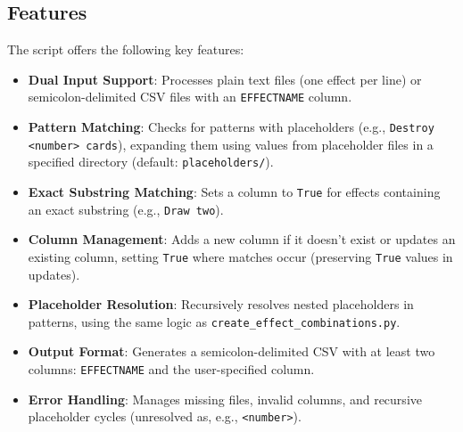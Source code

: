 \subsection{Features}
The script offers the following key features:
\begin{itemize}
    \item \textbf{Dual Input Support}: Processes plain text files (one effect per line) or semicolon-delimited CSV files with an \texttt{EFFECTNAME} column.
    \item \textbf{Pattern Matching}: Checks for patterns with placeholders (e.g., \texttt{Destroy <number> cards}), expanding them using values from placeholder files in a specified directory (default: \texttt{placeholders/}).
    \item \textbf{Exact Substring Matching}: Sets a column to \texttt{True} for effects containing an exact substring (e.g., \texttt{Draw two}).
    \item \textbf{Column Management}: Adds a new column if it doesn’t exist or updates an existing column, setting \texttt{True} where matches occur (preserving \texttt{True} values in updates).
    \item \textbf{Placeholder Resolution}: Recursively resolves nested placeholders in patterns, using the same logic as \texttt{create\_effect\_combinations.py}.
    \item \textbf{Output Format}: Generates a semicolon-delimited CSV with at least two columns: \texttt{EFFECTNAME} and the user-specified column.
    \item \textbf{Error Handling}: Manages missing files, invalid columns, and recursive placeholder cycles (unresolved as, e.g., \texttt{<number>}).
\end{itemize}

